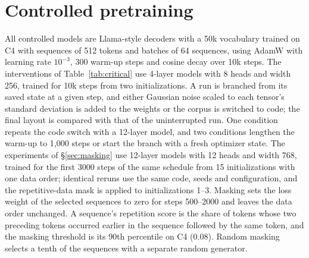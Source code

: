 \documentclass[11pt]{article}
\begin{document}
\begin{table}[t]
\centering\small
\setlength{\tabcolsep}{3pt}
\resizebox{\columnwidth}{!}{}
\caption{Mapping the standard Pythia model's carriers onto a target model: damage of the mapped heads in the target relative to the target's own carriers, on held-out prompts.
A mapping that uses a causal readout in the target recovers the carriers for every pair.}
\label{tab:mapping}
\end{table}

\section{Controlled pretraining}
\label{app:controlled}
All controlled models are Llama-style decoders with a 50k vocabulary trained on C4 with sequences of 512 tokens and batches of 64 sequences, using AdamW with learning rate $10^{-3}$, 300 warm-up steps and cosine decay over 10k steps.
The interventions of Table~\ref{tab:critical} use 4-layer models with 8 heads and width 256, trained for 10k steps from two initializations.
A run is branched from its saved state at a given step, and either Gaussian noise scaled to each tensor's standard deviation is added to the weights or the corpus is switched to code; the final layout is compared with that of the uninterrupted run.
One condition repeats the code switch with a 12-layer model, and two conditions lengthen the warm-up to 1{,}000 steps or start the branch with a fresh optimizer state.
The experiments of \S\ref{sec:masking} use 12-layer models with 12 heads and width 768, trained for the first 3000 steps of the same schedule from 15 initializations with one data order; identical reruns use the same code, seeds and configuration, and the repetitive-data mask is applied to initializations 1--3.
Masking sets the loss weight of the selected sequences to zero for steps 500--2000 and leaves the data order unchanged.
A sequence's repetition score is the share of tokens whose two preceding tokens occurred earlier in the sequence followed by the same token, and the masking threshold is its 90th percentile on C4 (0.08).
Random masking selects a tenth of the sequences with a separate random generator.
\end{document}

